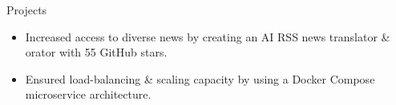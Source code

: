 \documentclass{resume} %
\begin{document}
\begin{workSection}{Projects}
	\customItem[
		title=\href{https://github.com/AshkanArabim/newsbridge}{Newsbridge },
		technologies= | FastAPI{,} React{,} PostgreSQL{,} JavaScript{,} Docker,
		duration=%
	]
	\begin{itemize}
		\vspace{-0.5em}
		\itemsep -6pt {}
		\item Increased access to diverse news by creating an AI RSS news translator \& orator with {55 GitHub stars}.
		\item Ensured load-balancing \& scaling capacity by using a Docker Compose microservice architecture.
	\end{itemize}
	

\end{workSection}
\end{document}
